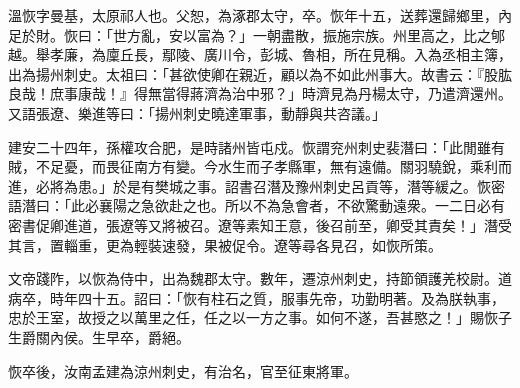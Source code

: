 \begin{pinyinscope}
 
 
 溫恢字曼基，太原祁人也。父恕，為涿郡太守，卒。恢年十五，送葬還歸鄉里，內足於財。恢曰：「世方亂，安以富為？」一朝盡散，振施宗族。州里高之，比之郇越。舉孝廉，為廩丘長，鄢陵、廣川令，彭城、魯相，所在見稱。入為丞相主簿，出為揚州刺史。太祖曰：「甚欲使卿在親近，顧以為不如此州事大。故書云：『股肱良哉！庶事康哉！』得無當得蔣濟為治中邪？」時濟見為丹楊太守，乃遣濟還州。又語張遼、樂進等曰：「揚州刺史曉達軍事，動靜與共咨議。」
 
 
 
 
 建安二十四年，孫權攻合肥，是時諸州皆屯戍。恢謂兖州刺史裴潛曰：「此閒雖有賊，不足憂，而畏征南方有變。今水生而子孝縣軍，無有遠備。關羽驍銳，乘利而進，必將為患。」於是有樊城之事。詔書召潛及豫州刺史呂貢等，潛等緩之。恢密語潛曰：「此必襄陽之急欲赴之也。所以不為急會者，不欲驚動遠衆。一二日必有密書促卿進道，張遼等又將被召。遼等素知王意，後召前至，卿受其責矣！」潛受其言，置輜重，更為輕裝速發，果被促令。遼等尋各見召，如恢所策。
 
 
 
 
 文帝踐阼，以恢為侍中，出為魏郡太守。數年，遷涼州刺史，持節領護羌校尉。道病卒，時年四十五。詔曰：「恢有柱石之質，服事先帝，功勤明著。及為朕執事，忠於王室，故授之以萬里之任，任之以一方之事。如何不遂，吾甚愍之！」賜恢子生爵關內侯。生早卒，爵絕。
 
 
 
 
 恢卒後，汝南孟建為涼州刺史，有治名，官至征東將軍。
 
 
 
 
\end{pinyinscope}